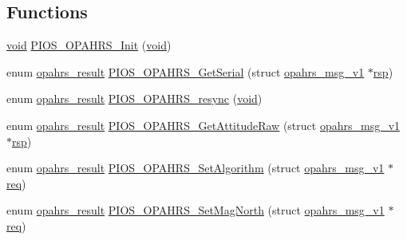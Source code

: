 \subsection*{Functions}
\begin{DoxyCompactItemize}
\item 
\hyperlink{group___n_a_m_e_ga18028b8badbf1ea7e704ccac3c488e82}{void} \hyperlink{group___p_i_o_s___o_p_a_h_r_s_ga67ca7bfc93dd4242084641433d56f6f7}{P\-I\-O\-S\-\_\-\-O\-P\-A\-H\-R\-S\-\_\-\-Init} (\hyperlink{group___n_a_m_e_ga18028b8badbf1ea7e704ccac3c488e82}{void})
\item 
enum \hyperlink{group___p_i_o_s___o_p_a_h_r_s_gaf6fe64d28ea92983e870494d0a5d05bd}{opahrs\-\_\-result} \hyperlink{group___p_i_o_s___o_p_a_h_r_s_ga75623cd403d1d9da708ae4ff42c2f09a}{P\-I\-O\-S\-\_\-\-O\-P\-A\-H\-R\-S\-\_\-\-Get\-Serial} (struct \hyperlink{structopahrs__msg__v1}{opahrs\-\_\-msg\-\_\-v1} $\ast$\hyperlink{pios__opahrs__proto_8h_a33704cbdda2899ee80b99a109f814568}{rsp})
\item 
enum \hyperlink{group___p_i_o_s___o_p_a_h_r_s_gaf6fe64d28ea92983e870494d0a5d05bd}{opahrs\-\_\-result} \hyperlink{group___p_i_o_s___o_p_a_h_r_s_gab167c91b006ac9f0b334289760271b56}{P\-I\-O\-S\-\_\-\-O\-P\-A\-H\-R\-S\-\_\-resync} (\hyperlink{group___n_a_m_e_ga18028b8badbf1ea7e704ccac3c488e82}{void})
\item 
enum \hyperlink{group___p_i_o_s___o_p_a_h_r_s_gaf6fe64d28ea92983e870494d0a5d05bd}{opahrs\-\_\-result} \hyperlink{group___p_i_o_s___o_p_a_h_r_s_ga6a2460efc73e4077b41f3db454142bd7}{P\-I\-O\-S\-\_\-\-O\-P\-A\-H\-R\-S\-\_\-\-Get\-Attitude\-Raw} (struct \hyperlink{structopahrs__msg__v1}{opahrs\-\_\-msg\-\_\-v1} $\ast$\hyperlink{pios__opahrs__proto_8h_a33704cbdda2899ee80b99a109f814568}{rsp})
\item 
enum \hyperlink{group___p_i_o_s___o_p_a_h_r_s_gaf6fe64d28ea92983e870494d0a5d05bd}{opahrs\-\_\-result} \hyperlink{group___p_i_o_s___o_p_a_h_r_s_gac7ff2fa43e0673e0b9665cbd587a2c37}{P\-I\-O\-S\-\_\-\-O\-P\-A\-H\-R\-S\-\_\-\-Set\-Algorithm} (struct \hyperlink{structopahrs__msg__v1}{opahrs\-\_\-msg\-\_\-v1} $\ast$\hyperlink{pios__opahrs__proto_8h_ad651fd9affe5ed0ac9abccd8e2791a2c}{req})
\item 
enum \hyperlink{group___p_i_o_s___o_p_a_h_r_s_gaf6fe64d28ea92983e870494d0a5d05bd}{opahrs\-\_\-result} \hyperlink{group___p_i_o_s___o_p_a_h_r_s_ga5f33585c0a6aa5158e015cc5fed5a042}{P\-I\-O\-S\-\_\-\-O\-P\-A\-H\-R\-S\-\_\-\-Set\-Mag\-North} (struct \hyperlink{structopahrs__msg__v1}{opahrs\-\_\-msg\-\_\-v1} $\ast$\hyperlink{pios__opahrs__proto_8h_ad651fd9affe5ed0ac9abccd8e2791a2c}{req})

\end{DoxyCompactItemize}
